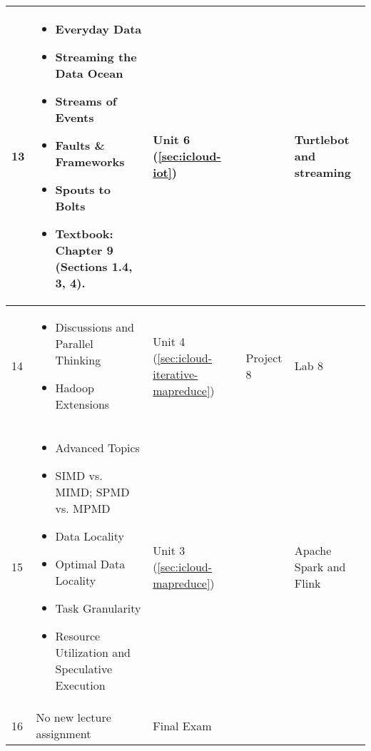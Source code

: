 \begin{center}
\begin{longtable}{|l|p{7cm}|p{1.5cm}|p{1.5cm}|p{1.5cm}|}
    \hline
     13 &
    \begin{itemize}[leftmargin=*]
      \item Everyday Data
      \item Streaming the Data Ocean
      \item Streams of Events
      \item Faults \& Frameworks
      \item Spouts to Bolts
      \item Textbook: Chapter 9 (Sections 1.4, 3, 4).
    \end{itemize}
    & Unit 6 (\ref{sec:icloud-iot}) &	 ~ & Turtlebot and streaming \\
    \hline
     14 &
    \begin{itemize}[leftmargin=*]
      \item Discussions and Parallel Thinking
      \item Hadoop Extensions
    \end{itemize}
    & Unit 4 (\ref{sec:icloud-iterative-mapreduce}) &	Project 8 &	Lab 8 \\
    \hline
     15 &
    \begin{itemize}[leftmargin=*]
      \item Advanced Topics
      \item SIMD vs. MIMD; SPMD vs. MPMD
      \item Data Locality
      \item Optimal Data Locality
      \item Task Granularity
      \item Resource Utilization and Speculative Execution
    \end{itemize}
    & Unit 3 (\ref{sec:icloud-mapreduce}) &	~ & Apache Spark and Flink  \\
    \hline
     16 &
    No new lecture assignment
    & Final Exam & ~ & ~ \\
    \hline
  \end{longtable}
\end{center}
